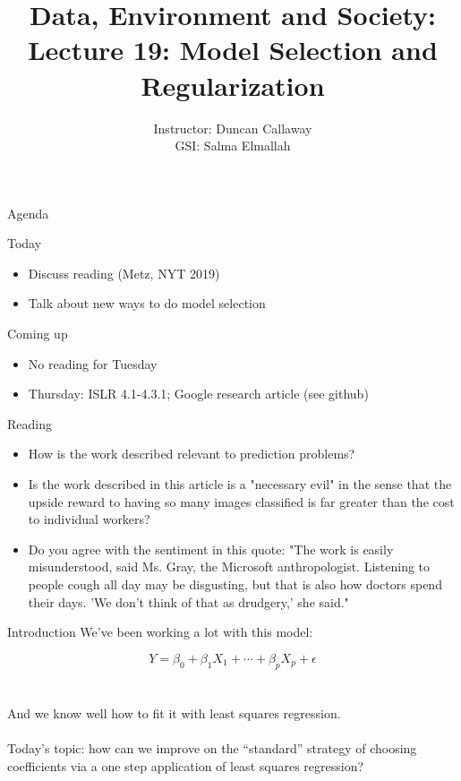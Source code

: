 \documentclass[mathserif, aspectratio=169]{beamer}
\title[Lecture 14] %
{Data, Environment and Society: \\{Lecture 19: Model Selection and Regularization}}
\author[ER131: Data, Environment and Society] 
{Instructor: Duncan Callaway\\
GSI: Salma Elmallah}
\institute[UC Berkeley] %
 {\small{ \bf October 17, 2019}}
\date[October 27, 2019]
\begin{document}
\frame{
  \titlepage
}
\begin{frame}{Agenda}

Today
\begin{itemize}
	\item Discuss reading (Metz, NYT 2019)
	\item Talk about new ways to do model selection
\end{itemize}

Coming up
\begin{itemize}
	\item No reading for Tuesday
	\item Thursday: ISLR 4.1-4.3.1; Google research article (see github) 
\end{itemize}

\end{frame}

\begin{frame}{Reading}

\begin{itemize}
	\item How is the work described relevant to prediction problems?  
	\item  Is the work described in this article is a "necessary evil" in the sense that the upside reward to having so many images classified is far greater than the cost to individual workers?
	\item  Do you agree with the sentiment in this quote: "The work is easily misunderstood, said Ms. Gray, the Microsoft anthropologist. Listening to people cough all day may be disgusting, but that is also how doctors spend their days. 'We don’t think of that as drudgery,' she said."
\end{itemize}


\end{frame}

\begin{frame}{Introduction}
We've been working a lot with this model:

\begin{equation*}
Y = \beta_0+\beta_1X_1+\cdots+\beta_pX_p+\epsilon
\end{equation*}\\~\\
And we know well how to fit it with least squares regression.\\~\\

Today's topic: how can we improve on the ``standard'' strategy of choosing coefficients via a one step application of least squares regression?\\~\\
\end{frame}
\end{document}
